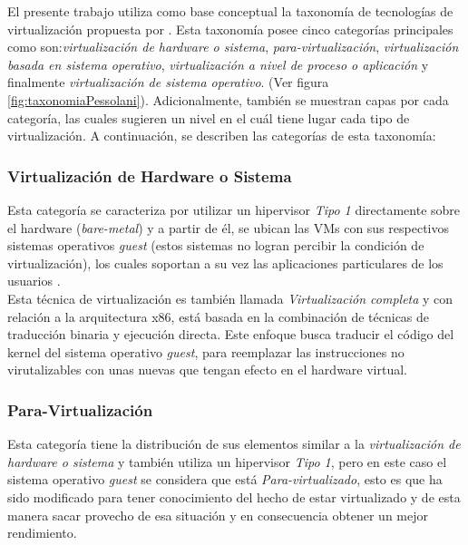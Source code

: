 
El presente trabajo utiliza como base conceptual la taxonomía de tecnologías de virtualización propuesta por \textcite{Pessolani2012}. Esta taxonomía posee cinco categorías principales como son:\textit{virtualización de hardware o sistema}, \textit{para-virtualización}, \textit{virtualización basada en sistema operativo}, \textit{virtualización a nivel de proceso o aplicación} y finalmente \textit{virtualización de sistema operativo}. (Ver figura \ref{fig:taxonomiaPessolani}). Adicionalmente, también se muestran capas por cada categoría, las cuales sugieren un nivel en el cuál tiene lugar cada tipo de virtualización. A continuación, se describen las categorías de esta taxonomía:\\


\subsubsection{Virtualización de Hardware o Sistema}
Esta categoría se caracteriza por utilizar un hipervisor \textit{Tipo 1} directamente sobre el hardware (\textit{bare-metal}) y a partir de él, se ubican las VMs con sus respectivos sistemas operativos \textit{guest} (estos sistemas no logran percibir la condición de virtualización), los cuales soportan a su vez las aplicaciones particulares de los usuarios \parencite{Pessolani2012}.\\

Esta técnica de virtualización es también llamada \textit{Virtualización completa} y con relación a la arquitectura x86, está basada en la combinación de técnicas de traducción binaria y ejecución directa. Este enfoque busca traducir el código del kernel del sistema operativo \textit{guest}, para reemplazar las instrucciones no virutalizables con unas nuevas que tengan efecto en el hardware virtual\parencite{VMware2008}. 

\subsubsection{Para-Virtualización}
Esta categoría tiene la distribución de sus elementos similar a la \textit{virtualización de hardware o sistema} y también utiliza un hipervisor \textit{Tipo 1}, pero en este caso el sistema operativo \textit{guest} se considera que está \textit{Para-virtualizado}, esto es que ha sido modificado para tener conocimiento del hecho de estar virtualizado y de esta manera sacar provecho de esa situación y en consecuencia obtener un mejor rendimiento. \parencite{Pessolani2012}\\

